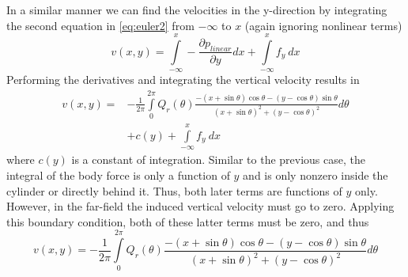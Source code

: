 \documentclass{article}
\begin{document}
In a similar manner we can find the velocities in the y-direction by integrating the second equation in \eqref{eq:euler2} from $-\infty$ to $x$ (again ignoring nonlinear terms)
\begin{equation}
  v(x, y) = \int\limits_{-\infty}^x-\frac{\partial p_{linear}}{\partial y} dx + \int\limits_{-\infty}^x f_y\ dx
\end{equation}
Performing the derivatives and integrating the vertical velocity results in
\begin{equation}
\begin{aligned}
v(x, y) =& -\frac{1}{2\pi}\int\limits_0^{2\pi} Q_r(\theta) \frac{-(x+\sin\theta)\cos\theta - (y-\cos\theta)\sin\theta}{(x+\sin\theta)^2 + (y-\cos\theta)^2} d\theta  \\
&+ c(y) + \int\limits_{-\infty}^x f_y\ dx
\end{aligned}
\end{equation}
where $c(y)$ is a constant of integration.  Similar to the previous case, the integral of the body force is only a function of $y$ and is only nonzero inside the cylinder or directly behind it.  Thus, both later terms are functions of $y$ only.  However, in the far-field the induced vertical velocity must go to zero.  Applying this boundary condition, both of these latter terms must be zero, and thus
\begin{equation}
v(x, y) = -\frac{1}{2\pi}\int\limits_0^{2\pi} Q_r(\theta) \frac{-(x+\sin\theta)\cos\theta - (y-\cos\theta)\sin\theta}{(x+\sin\theta)^2 + (y-\cos\theta)^2} d\theta
\label{eq:v}
\end{equation}
\end{document}
